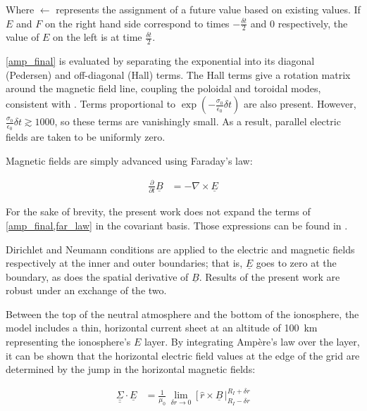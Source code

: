 \documentclass[draft,linenumbers]{agujournal}
\begin{document}
Where $\leftarrow$ represents the assignment of a future value based on existing values. If $E$ and $F$ on the right hand side correspond to times $-\frac{\delta \! t}{2}$ and $0$ respectively, the value of $E$ on the left is at time $\frac{\delta \! t}{2}$.

\cref{amp_final} is evaluated by separating the exponential into its diagonal (Pedersen) and off-diagonal (Hall) terms. The Hall terms give a rotation matrix around the magnetic field line, coupling the poloidal and toroidal modes, consistent with \citet{hughes_1974}. Terms proportional to $\exp \left( - \frac{\sigma_0}{\epsilon_0}\delta \! t \right)$ are also present. However, $\frac{\sigma_0}{\epsilon_0}\delta \! t \gtrsim 1000$, so these terms are vanishingly small. As a result, parallel electric fields are taken to be uniformly zero.

Magnetic fields are simply advanced using Faraday's law:
\begin{linenomath*}
\begin{align}
    \label{far_law}
    \frac{\partial}{\partial t} \underline{B} &= - \nabla \times \underline{E}
\end{align}
\end{linenomath*}

For the sake of brevity, the present work does not expand the terms of \cref{amp_final,far_law} in the covariant basis. Those expressions can be found in \citet{mceachern_2016}.


Dirichlet and Neumann conditions are applied to the electric and magnetic fields respectively at the inner and outer boundaries; that is, $\underline{E}$ goes to zero at the boundary, as does the spatial derivative of $\underline{B}$. Results of the present work are robust under an exchange of the two.

Between the top of the neutral atmosphere and the bottom of the ionosphere, the model includes a thin, horizontal current sheet at an altitude of \SI{100}{\km} representing the ionosphere's $E$ layer\citep{lysak_2004}. By integrating Amp\`ere's law over the layer, it can be shown\citep{fujita_1988} that the horizontal electric field values at the edge of the grid are determined by the jump in the horizontal magnetic fields:
\begin{linenomath*}
\begin{align}
  \label{jump_condition}
  \underline{\underline{\Sigma}} \cdot \underline{E} &= \frac{1}{\mu_0} \,
    \displaystyle\lim_{\delta \! r \rightarrow 0} \, \bigg[ \, \hat{r} \times \underline{B}
    \, \bigg|^{R_I + \delta \! r}_{R_I - \delta \! r}
\end{align}
\end{linenomath*}
\end{document}
